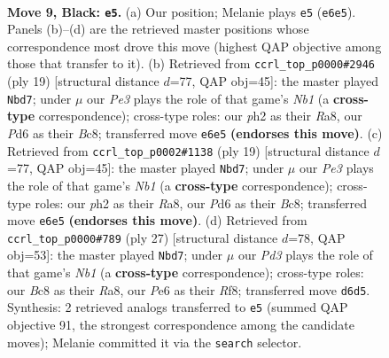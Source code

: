 \documentclass[11pt]{article}
\begin{document}
\clearpage

\begin{figure}[p]\centering
\begin{subfigure}{0.46\textwidth}\centering
\resizebox{\linewidth}{!}{%
\newchessgame
\chessboard[
  setfen={rnb1k2r/ppq1p1bp/3ppnp1/8/4P3/2N1BQ2/PPP2PPP/2KR1B1R b kq - 3 9},
  showmover=false,
  pgfstyle=straightmove, color=movearrow, markmove={e6-e5}
]}
\caption{}
\end{subfigure}\hfill
\begin{subfigure}{0.46\textwidth}\centering
\resizebox{\linewidth}{!}{%
\newchessgame
\chessboard[
  setfen={rnb1k2r/1pq1bpp1/p2ppn1p/8/3NPP1B/2N2Q2/PPP3PP/2KR1B1R b kq - 3 10},
  showmover=false,
  pgfstyle=straightmove, color=movearrow, markmove={b8-d7}
]}
\caption{}
\end{subfigure}
\\[4pt]
\begin{subfigure}{0.46\textwidth}\centering
\resizebox{\linewidth}{!}{%
\newchessgame
\chessboard[
  setfen={rnb1k2r/1pq1bpp1/p2ppn1p/8/3NPP1B/2N2Q2/PPP3PP/2KR1B1R b kq - 1 10},
  showmover=false,
  pgfstyle=straightmove, color=movearrow, markmove={b8-d7}
]}
\caption{}
\end{subfigure}\hfill
\begin{subfigure}{0.46\textwidth}\centering
\resizebox{\linewidth}{!}{%
\newchessgame
\chessboard[
  setfen={rn3rk1/1pq1bppp/p2p1n2/3Pp3/P1B5/3Q4/1PPN1PPP/R1B2RK1 b - - 1 14},
  showmover=false,
  pgfstyle=straightmove, color=movearrow, markmove={b8-d7}
]}
\caption{}
\end{subfigure}
\caption{\textbf{Move 9, Black: \texttt{e5}.} (a) Our position; Melanie plays \texttt{e5} (\texttt{e6e5}). Panels (b)--(d) are the retrieved master positions whose correspondence most drove this move (highest QAP objective among those that transfer to it). (b) Retrieved from \texttt{ccrl\_top\_p0000\#2946} (ply 19) [structural distance $d$=77, QAP obj=45]: the master played \texttt{Nbd7}; under $\mu$ our \emph{Pe3} plays the role of that game's \emph{Nb1} (a \textbf{cross-type} correspondence); cross-type roles: our \emph{p}h2 as their \emph{R}a8, our \emph{P}d6 as their \emph{B}c8; transferred move \texttt{e6e5} \textbf{(endorses this move)}. (c) Retrieved from \texttt{ccrl\_top\_p0002\#1138} (ply 19) [structural distance $d$=77, QAP obj=45]: the master played \texttt{Nbd7}; under $\mu$ our \emph{Pe3} plays the role of that game's \emph{Nb1} (a \textbf{cross-type} correspondence); cross-type roles: our \emph{p}h2 as their \emph{R}a8, our \emph{P}d6 as their \emph{B}c8; transferred move \texttt{e6e5} \textbf{(endorses this move)}. (d) Retrieved from \texttt{ccrl\_top\_p0000\#789} (ply 27) [structural distance $d$=78, QAP obj=53]: the master played \texttt{Nbd7}; under $\mu$ our \emph{Pd3} plays the role of that game's \emph{Nb1} (a \textbf{cross-type} correspondence); cross-type roles: our \emph{B}c8 as their \emph{R}a8, our \emph{P}e6 as their \emph{R}f8; transferred move \texttt{d6d5}. Synthesis: 2 retrieved analogs transferred to \texttt{e5} (summed QAP objective 91, the strongest correspondence among the candidate moves); Melanie committed it via the \texttt{search} selector.}
\label{fig:thought-m17}
\end{figure}
\end{document}
